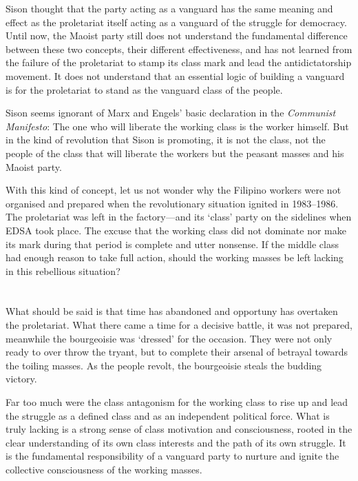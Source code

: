 Sison thought that the party acting as a vanguard
has the same meaning and effect 
as the proletariat itself acting as 
a vanguard of the struggle for democracy. 
Until now, 
the Maoist party still does not understand 
the fundamental difference between these two concepts, 
their different effectiveness, 
and has not learned from the failure of the proletariat 
to stamp its class mark 
and lead the antidictatorship movement. 
It does not understand that 
an essential logic of building a vanguard 
is for the proletariat 
to stand as the vanguard class of the people.

Sison seems ignorant of Marx and Engels' basic declaration 
in the \textit{Communist Manifesto}:
The one who will liberate the working class is the worker himself.
But in the kind of revolution that Sison is promoting, 
it is not the class, 
not the people of the class 
that will liberate the workers 
but the peasant masses and his Maoist party.

With this kind of concept, 
let us not wonder why the Filipino workers 
were not organised and prepared 
when the revolutionary situation ignited in 1983--1986. 
The proletariat was left in the factory---and 
its `class' party on the sidelines when EDSA took place. 
The excuse that the working class did not dominate nor make its mark 
during that period 
is complete and utter nonsense.
If the middle class had enough reason to take full action, 
should the working masses be left lacking in this rebellious situation?


\section{}
What should be said is that
time has abandoned and opportuny has overtaken
the proletariat.
What there came a time for a decisive battle, 
it was not prepared,
meanwhile the bourgeoisie was `dressed' for the occasion.
They were not only ready to over throw the tryant,
but to complete their arsenal of betrayal towards the toiling masses.
As the people revolt, 
the bourgeoisie steals the budding victory.

Far too much 
were the class antagonism 
for the working class to rise up 
and lead the struggle as a defined class 
and as an independent political force. 
What is truly lacking 
is a strong sense of class motivation and consciousness, 
rooted in the clear understanding 
of its own class interests and the path of its own struggle. 
It is the fundamental responsibility of a vanguard party 
to nurture and ignite the collective consciousness 
of the working masses.

